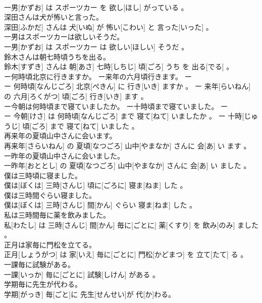 \documentclass[8pt]{extreport}
\begin{document}
\begin{CJK}{UTF8}{min}
\\	一男[かずお] は スポーツカー を 欲し[ほし] がっている 。
\\	深田さんは犬が怖いと言った。	
\\	深田[ふかだ] さんは 犬[いぬ] が 怖い[こわい] と 言った[いった] 。
\\	一男はスポーツカーは欲しいそうだ。	
\\	一男[かずお] は スポーツカー は 欲しい[ほしい] そうだ 。
\\	鈴木さんは朝七時頃うちを出る。	
\\	鈴木[すずき] さんは 朝[あさ] 七時[しちじ] 頃[ごろ] うち を 出る[でる] 。
\\	ー何時頃北京に行きますか。 ー来年の六月頃行きます。	ー
\\	ー 何時頃[なんじごろ] 北京[ぺきん] に 行き[いき] ますか 。 ー 来年[らいねん] の 六月[ろくがつ] 頃[ごろ] 行き[いき] ます 。
\\	ー今朝は何時頃まで寝ていましたか。 ー十時頃まで寝ていました。	ー
\\	ー 今朝[けさ] は 何時頃[なんじごろ] まで 寝て[ねて] いましたか 。 ー 十時[じゅうじ] 頃[ごろ] まで 寝て[ねて] いました 。
\\	再来年の夏頃山中さんに会います。	
\\	再来年[さらいねん] の 夏頃[なつごろ] 山中[やまなか] さんに 会[あ] い ます 。
\\	一昨年の夏頃山中さんに会いました。	
\\	一昨年[おととし] の 夏頃[なつごろ] 山中[やまなか] さんに 会[あ] い ました 。
\\	僕は三時頃に寝ました。	
\\	僕は[ぼくは] 三時[さんじ] 頃に[ごろに] 寝ま[ねま] した 。
\\	僕は三時間ぐらい寝ました。	
\\	僕は[ぼくは] 三時[さんじ] 間[かん] ぐらい 寝ま[ねま] した 。
\\	私は三時間毎に薬を飲みました。	
\\	私[わたし] は 三時[さんじ] 間[かん] 毎に[ごとに] 薬[くすり] を 飲み[のみ] ました 。
\\	正月は家毎に門松を立てる。	
\\	正月[しょうがつ] は 家[いえ] 毎に[ごとに] 門松[かどまつ] を 立て[たて] る 。
\\	一課毎に試験がある。	
\\	一課[いっか] 毎に[ごとに] 試験[しけん] がある 。
\\	学期毎に先生が代わる。	
\\	学期[がっき] 毎[ごと]に 先生[せんせい]が 代[か]わる。

\end{CJK}
\end{document}
